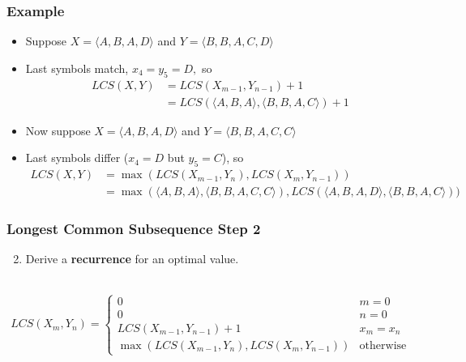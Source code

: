 \documentclass{beamer}
\newcommand{\stanza}{ \\~\ }
\begin{document}
    \begin{frame} \frametitle{Example}
      \begin{itemize}
        \item Suppose $X=\langle A, B, A, D \rangle$ and $Y = \langle B, B, A, C, D \rangle$
        \item Last symbols match,  $x_4=y_5=D,$ so
          \begin{align*}
            LCS(X,Y) &= LCS(X_{m-1}, Y_{n-1}) + 1 \\
            &= LCS(\langle A, B, A \rangle, \langle B, B, A, C \rangle) + 1
          \end{align*}
        \item Now suppose $X=\langle A, B, A, D \rangle$ and $Y = \langle B, B, A, C, C \rangle$
        \item Last symbols differ ($x_4=D$ but $y_5=C$), so
          {\footnotesize
          \begin{align*}
            LCS(X,Y)
            &= \max(LCS(X_{m-1}, Y_n), LCS(X_m, Y_{n-1})) \\
            &= \max(\langle A, B, A \rangle, \langle B, B, A, C, C \rangle), LCS(\langle A, B, A, D \rangle, \langle B, B, A, C \rangle)) 
          \end{align*}
          }
        \end{itemize}
        
    \end{frame}
    
  \begin{frame} \frametitle{Longest Common Subsequence Step 2}
    \begin{enumerate}
      \setcounter{enumi}{1}
      \item Derive a \textbf{recurrence} for an optimal value.
      \stanza
    \end{enumerate}

\[ LCS(X_m, Y_n) =
    \begin{cases}
      0 & m=0 \\
      0 & n=0 \\
      LCS(X_{m-1}, Y_{n-1}) + 1 & x_m=x_n \\
      \max(LCS(X_{m-1}, Y_n), LCS(X_m, Y_{n-1})) & \text{otherwise}
    \end{cases}
  \]
  \end{frame}
\end{document}
